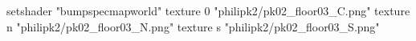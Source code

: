 setshader "bumpspecmapworld"
    texture 0 "philipk2/pk02_floor03_C.png"
    texture n "philipk2/pk02_floor03_N.png"
    texture s "philipk2/pk02_floor03_S.png"
